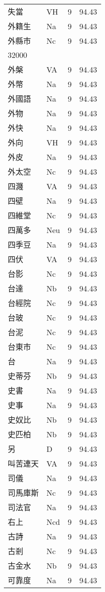 \documentclass[twocolumn]{book}
\begin{document}
\begin{supertabular}{llrr}
失當 & VH & 9 &  94.43\\
外籍生 & Na & 9 &  94.43\\
外縣市 & Nc & 9 &  94.43\\
32000\\
外槃 & VA & 9 &  94.43\\
外幣 & Na & 9 &  94.43\\
外國語 & Na & 9 &  94.43\\
外物 & Na & 9 &  94.43\\
外快 & Na & 9 &  94.43\\
外向 & VH & 9 &  94.43\\
外皮 & Na & 9 &  94.43\\
外太空 & Nc & 9 &  94.43\\
四濺 & VA & 9 &  94.43\\
四壁 & Na & 9 &  94.43\\
四維堂 & Nc & 9 &  94.43\\
四萬多 & Neu & 9 &  94.43\\
四季豆 & Na & 9 &  94.43\\
四伏 & VA & 9 &  94.43\\
台影 & Nc & 9 &  94.43\\
台達 & Nb & 9 &  94.43\\
台經院 & Nc & 9 &  94.43\\
台玻 & Nc & 9 &  94.43\\
台泥 & Nc & 9 &  94.43\\
台東市 & Nc & 9 &  94.43\\
台 & Na & 9 &  94.43\\
史蒂芬 & Nb & 9 &  94.43\\
史書 & Na & 9 &  94.43\\
史事 & Na & 9 &  94.43\\
史奴比 & Nb & 9 &  94.43\\
史匹柏 & Nb & 9 &  94.43\\
另 & D & 9 &  94.43\\
叫苦連天 & VA & 9 &  94.43\\
司儀 & Na & 9 &  94.43\\
司馬庫斯 & Nc & 9 &  94.43\\
司法官 & Na & 9 &  94.43\\
右上 & Ncd & 9 &  94.43\\
古詩 & Na & 9 &  94.43\\
古剎 & Nc & 9 &  94.43\\
古金水 & Nb & 9 &  94.43\\
可靠度 & Na & 9 &  94.43\\

\end{supertabular}
\end{document}
